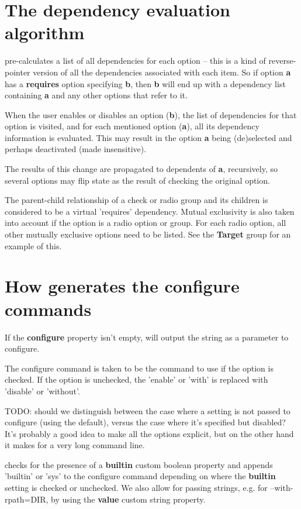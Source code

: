 \section{The dependency evaluation algorithm}

\ctshortname pre-calculates a list of all dependencies
for each option -- this is a kind of reverse-pointer version
of all the dependencies associated with each item. So
if option {\bf a} has a {\bf requires} option specifying
{\bf b}, then {\bf b} will end up with a dependency list
containing {\bf a} and any other options that refer to it.

When the user enables or disables an option ({\bf b}),
the list of dependencies for that option is visited,
and for each mentioned option ({\bf a}), all its dependency information
is evaluated. This may result in the option {\bf a} being
(de)selected and perhaps deactivated (made insensitive).

The results of this change are propagated to dependents of
{\bf a}, recursively, so several options may flip state
as the result of checking the original option.

The parent-child relationship of a check or radio
group and its children is considered to be a virtual
'requires' dependency. Mutual exclusivity is also
taken into account if the option is a radio option
or group. For each radio option, all other mutually
exclusive options need to be listed. See the
{\bf Target} group for an example of this.

\section{How \ctshortname generates the configure commands}

If the {\bf configure} property isn't empty,
\ctshortname will output the string as a parameter
to configure.

The configure command is taken to be the command to
use if the option is checked. If the option is
unchecked, the 'enable' or 'with' is replaced with
'disable' or 'without'.

TODO: should we distinguish between the case
where a setting is not passed to configure (using
the default), versus the case where it's specified but disabled?
It's probably a good idea to make all the options
explicit, but on the other hand it makes for a very long
command line.

\ctshortname checks for the presence of a
{\bf builtin} custom boolean property and appends 'builtin' or
'sys' to the configure command depending on where
the {\bf builtin} setting is checked or unchecked.
We also allow for passing strings, e.g. for --with-rpath=DIR,
by using the {\bf value} custom string property.

